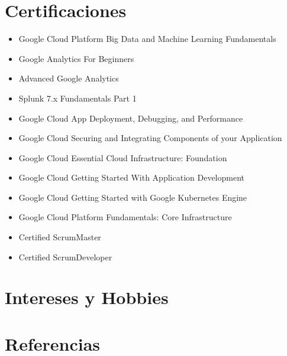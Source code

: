\documentclass[11pt,a4paper]{moderncv}
\begin{document}
\section{Certificaciones}
\begin{itemize}
	\item Google Cloud Platform Big Data and Machine Learning Fundamentals
	\item Google Analytics For Beginners
	\item Advanced Google Analytics
	\item Splunk 7.x Fundamentals Part 1
	\item Google Cloud App Deployment, Debugging, and Performance
	\item Google Cloud Securing and Integrating Components of your Application
	\item Google Cloud Essential Cloud Infrastructure: Foundation
	\item Google Cloud Getting Started With Application Development
	\item Google Cloud Getting Started with Google Kubernetes Engine
	\item Google Cloud Platform Fundamentals: Core Infrastructure
	\item Certified ScrumMaster
	\item Certified ScrumDeveloper
\end{itemize}

\section{Intereses y Hobbies}

\section{Referencias}
\small
{}

\closesection{}                   %
\renewcommand{\listitemsymbol}{-} %

%
\end{document}
